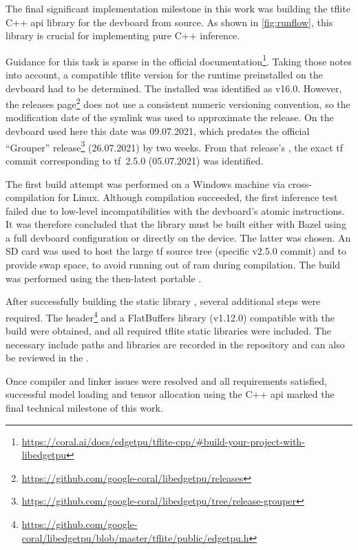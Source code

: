 {The final significant implementation milestone in this work was building the \gls{tflite} C++ \gls{api} library for the \gls{devboard} from source.
As shown in \autoref{fig:runflow}, this library is crucial for implementing pure C++ inference.

Guidance for this task is sparse in the official documentation\footnote{\url{https://coral.ai/docs/edgetpu/tflite-cpp/\#build-your-project-with-libedgetpu}}.
Taking those notes into account, a compatible \gls{tflite} version for the  runtime preinstalled on the \gls{devboard} had to be determined.
The installed  was identified as v16.0. However, the releases page\footnote{\url{https://github.com/google-coral/libedgetpu/releases}}
does not use a consistent numeric versioning convention, so the modification date of the  symlink was used to approximate the release.
On the \gls{devboard} used here this date was 09.07.2021,
which predates the official “Grouper”  release\footnote{\url{https://github.com/google-coral/libedgetpu/tree/release-grouper}} (26.07.2021) by two weeks.
From that release's , the exact \gls{tf} commit corresponding to \gls{tf}~2.5.0 (05.07.2021) was identified.

The first build attempt was performed on a Windows machine via cross-compilation for  Linux.
Although compilation succeeded, the first inference test failed due to low-level incompatibilities with the \gls{devboard}'s atomic instructions.
It was therefore concluded that the library must be built either with Bazel using a full \gls{devboard} configuration or directly on the device.
The latter was chosen. An SD card was used to host the large \gls{tf} source tree (specific v2.5.0 commit) and to provide swap space,
to avoid running out of \gls{ram} during compilation. The build was performed using the then-latest portable .

After successfully building the static library , several additional steps were required.
The  header\footnote{\url{https://github.com/google-coral/libedgetpu/blob/master/tflite/public/edgetpu.h}} and a FlatBuffers library (v1.12.0) compatible with the build were obtained,
and all required \gls{tflite} static libraries were included.
The necessary include paths and libraries are recorded in the repository and can also be reviewed in the .

Once compiler and linker issues were resolved and all requirements satisfied, successful model loading and tensor allocation using the C++ \gls{api}
marked the final technical milestone of this work.

}
